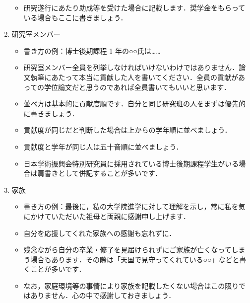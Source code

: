 \begin{enumerate}
\begin{itemize}
        \item 研究遂行にあたり助成等を受けた場合に記載します．奨学金をもらっている場合もここに書きましょう．
    \end{itemize}
    \item 研究室メンバー
    \begin{itemize}
        \item 書き方の例：博士後期課程 1 年の○○氏は……
        \item 研究室メンバー全員を列挙しなければいけないわけではありません．論文執筆にあたって本当に貢献した人を書いてください．全員の貢献があっての学位論文だと思うのであれば全員書いてもいいと思います．
        \item 並べ方は基本的に貢献度順です．自分と同じ研究班の人をまずは優先的に書きましょう．
        \item 貢献度が同じだと判断した場合は上からの学年順に並べましょう．
        \item 貢献度と学年が同じ人は五十音順に並べましょう．
        \item 日本学術振興会特別研究員に採用されている博士後期課程学生がいる場合は肩書きとして併記することが多いです．
    \end{itemize}
    \item 家族
    \begin{itemize}
        \item 書き方の例：最後に，私の大学院進学に対して理解を示し，常に私を気にかけていただいた祖母と両親に感謝申し上げます．
        \item 自分を応援してくれた家族への感謝も忘れずに．
        \item 残念ながら自分の卒業・修了を見届けられずにご家族が亡くなってしまう場合もあります．その際は「天国で見守ってくれている○○」などと書くことが多いです．
        \item なお，家庭環境等の事情により家族を記載したくない場合はこの限りではありません．心の中で感謝しておきましょう．
    \end{itemize}
\end{enumerate}

